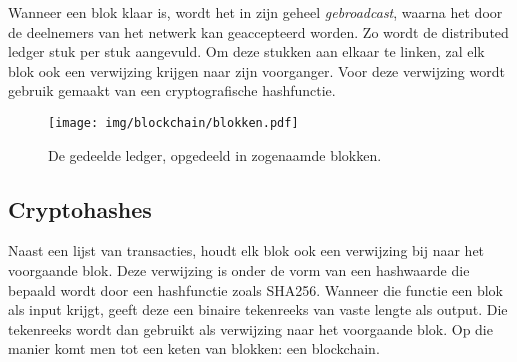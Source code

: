 Wanneer een blok klaar is, wordt het in zijn geheel \textit{gebroadcast}, waarna het door de deelnemers van het netwerk kan geaccepteerd worden. Zo wordt de distributed ledger stuk per stuk aangevuld.
Om deze stukken aan elkaar te linken, zal elk blok ook een verwijzing krijgen naar zijn voorganger. Voor deze verwijzing wordt gebruik gemaakt van een cryptografische hashfunctie. 

\begin{figure}[H]
	\centering
	\texttt{[image: img/blockchain/blokken.pdf]}
	\caption{\label{fig:blokken}De gedeelde ledger, opgedeeld in zogenaamde blokken.}
\end{figure}

\subsection{Cryptohashes}
\label{sub:cryptografische-hashfunctie}

Naast een lijst van transacties, houdt elk blok ook een verwijzing bij naar het voorgaande blok. Deze verwijzing is onder de vorm van een hashwaarde die bepaald wordt door een hashfunctie zoals SHA256. Wanneer die functie een blok als input krijgt, geeft deze een binaire tekenreeks van vaste lengte als output. Die tekenreeks wordt dan gebruikt als verwijzing naar het voorgaande blok. Op die manier komt men tot een keten van blokken: een blockchain.


